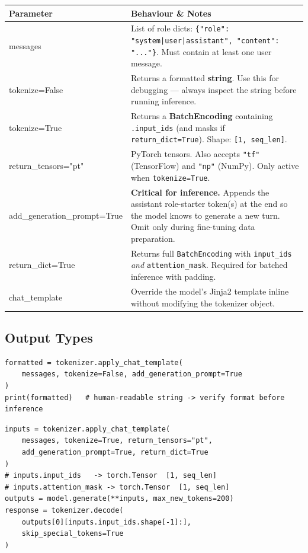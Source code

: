 \documentclass[11pt,a4paper]{article}
\begin{document}
\renewcommand{\arraystretch}{1.3}
\begin{tabularx}{\linewidth}{>{\ttfamily\color{primaryBlue}}p{5.2cm} X}
\toprule
\normalfont\textbf{Parameter} & \textbf{Behaviour \& Notes} \\
\midrule
messages & List of role dicts: \texttt{\{"role": "system|user|assistant", "content": "..."\}}. Must contain at least one user message. \\
\addlinespace
tokenize=False & Returns a formatted \textbf{string}. Use this for debugging --- always inspect the string before running inference. \\
\addlinespace
tokenize=True & Returns a \textbf{BatchEncoding} containing \texttt{.input\_ids} (and masks if \texttt{return\_dict=True}). Shape: \texttt{[1, seq\_len]}. \\
\addlinespace
return\_tensors="pt" & PyTorch tensors. Also accepts \texttt{"tf"} (TensorFlow) and \texttt{"np"} (NumPy). Only active when \texttt{tokenize=True}. \\
\addlinespace
add\_generation\_prompt=True & \textbf{Critical for inference.} Appends the assistant role-starter token(s) at the end so the model knows to generate a new turn. Omit only during fine-tuning data preparation. \\
\addlinespace
return\_dict=True & Returns full \texttt{BatchEncoding} with \texttt{input\_ids} \emph{and} \texttt{attention\_mask}. Required for batched inference with padding. \\
\addlinespace
chat\_template & Override the model's Jinja2 template inline without modifying the tokenizer object. \\
\bottomrule
\end{tabularx}

\subsection{Output Types}

\begin{tcolorbox}[notebox={Mode 1 --- Debug / Inspect}]
\begin{lstlisting}[style=pycode, numbers=none]
formatted = tokenizer.apply_chat_template(
    messages, tokenize=False, add_generation_prompt=True
)
print(formatted)   # human-readable string -> verify format before inference
\end{lstlisting}
\end{tcolorbox}

\begin{tcolorbox}[tipbox={Mode 2 --- Inference Ready}]
\begin{lstlisting}[style=pycode, numbers=none]
inputs = tokenizer.apply_chat_template(
    messages, tokenize=True, return_tensors="pt",
    add_generation_prompt=True, return_dict=True
)
# inputs.input_ids   -> torch.Tensor  [1, seq_len]
# inputs.attention_mask -> torch.Tensor  [1, seq_len]
outputs = model.generate(**inputs, max_new_tokens=200)
response = tokenizer.decode(
    outputs[0][inputs.input_ids.shape[-1]:],
    skip_special_tokens=True
)
\end{lstlisting}
\end{tcolorbox}
\end{document}
